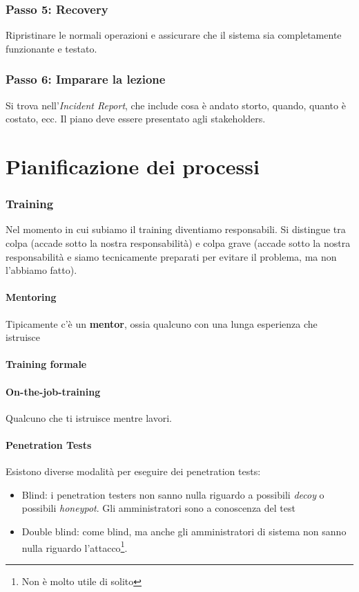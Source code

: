 \subsubsection{Passo 5: Recovery}

Ripristinare le normali operazioni e assicurare che il sistema sia completamente
funzionante e testato.

\subsubsection{Passo 6: Imparare la lezione}

Si trova nell'\textit{Incident Report}, che include cosa è andato storto,
quando, quanto è costato, ecc. Il piano deve essere presentato agli
stakeholders.


\section{Pianificazione dei processi}
\label{IRBC:pp}

\subsubsection{Training}

Nel momento in cui subiamo il training diventiamo responsabili. Si distingue tra
colpa (accade sotto la nostra responsabilità) e colpa grave (accade sotto la
nostra responsabilità e siamo tecnicamente preparati per evitare il problema, ma
non l'abbiamo fatto).

\paragraph*{Mentoring} Tipicamente c'è un \textbf{mentor}, ossia qualcuno con
una lunga esperienza che istruisce

\paragraph*{Training formale}

\paragraph*{On-the-job-training} Qualcuno che ti istruisce mentre lavori.


\paragraph*{Penetration Tests} Esistono diverse modalità per eseguire dei
penetration tests:
\begin{itemize}
\item Blind: i penetration testers non sanno nulla riguardo a possibili
\textit{decoy} o possibili \textit{honeypot}. Gli amministratori sono a
conoscenza del test
\item Double blind: come blind, ma anche gli amministratori di sistema non sanno
nulla riguardo l'attacco\footnote{Non è molto utile di solito}.
\end{itemize}

